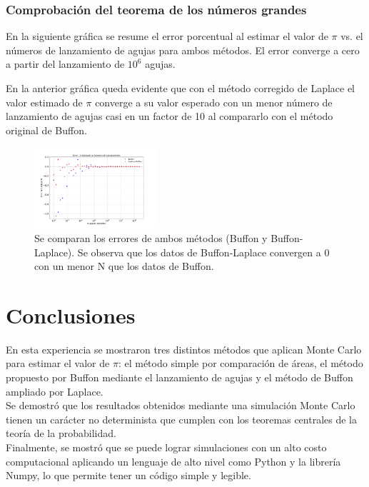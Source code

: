 \documentclass{rbf}
\begin{document}
\subsubsection{Comprobación del teorema de los números grandes}

En la siguiente gráfica se resume el error porcentual al estimar el valor de $\pi$ vs. el números de lanzamiento de agujas para ambos métodos. El error converge a cero a partir del lanzamiento de $10^6$ agujas.

En la anterior gráfica queda evidente que con el método corregido de Laplace el valor estimado de $\pi$ converge a su valor esperado con un menor número de lanzamiento de agujas casi en un factor de 10 al compararlo con el método original de Buffon. 

\begin{figure}[h]
 \centering
  \includegraphics[width=0.4\textwidth]{figures/err.jpg}
	\caption{Se comparan los errores de ambos métodos (Buffon y Buffon-Laplace). Se observa que los datos de Buffon-Laplace convergen a 0 con un menor N que los datos de Buffon.}
 \label{buff11}
\end{figure}

\section{Conclusiones}

En esta experiencia se mostraron tres distintos métodos que aplican Monte Carlo para estimar el valor de $\pi$: el método simple por comparación de áreas, el método propuesto por Buffon mediante el lanzamiento de agujas y el método de Buffon ampliado por Laplace. \\
Se demostró que los resultados obtenidos mediante una simulación Monte Carlo tienen un carácter no determinista que cumplen con los teoremas centrales de la teoría de la probabilidad. \\

Finalmente, se mostró que se puede lograr simulaciones con un alto costo computacional aplicando un lenguaje de alto nivel como Python y la librería Numpy, lo que permite tener un código simple y legible.
\end{document}
